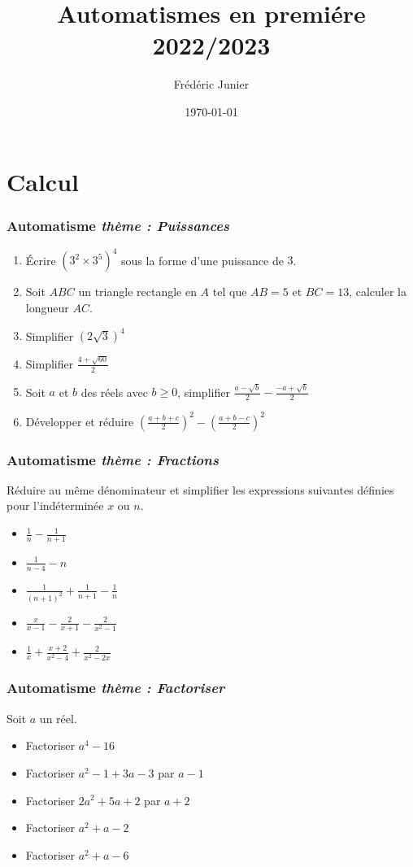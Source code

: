 \documentclass[11pt]{beamer}
\title[automatismes]{Automatismes en premi\'ere 2022/2023}
\author[F.Junier]{Fr\'ed\'eric Junier}
\institute[Le Parc]{{\centering Lyc\'ee du Parc \\
1 Boulevard Anatole France \\ 69006 Lyon }}
\date[\today]{\today}
\newcounter{autocompteur}
\newcommand{\automatisme}[1]{\addtocounter{autocompteur}{1}\frametitle{Automatisme  \theautocompteur  \textit{ thème : #1}}}
\begin{document}
\frame{\titlepage}

\section{Calcul}



\begin{frame}
\automatisme{Puissances}


\begin{enumerate}
	\item Écrire $(3^{2} \times 3^{5})^{4}$ sous la forme d'une puissance de $3$.
	\item Soit $ABC$ un triangle rectangle en $A$ tel que $AB=5$ et $BC=13$, calculer la longueur $AC$.
	\item Simplifier $\left(2\sqrt{3}\right)^{4}$
	\item Simplifier $\frac{4+\sqrt{60}}{2}$
	\item Soit $a$ et $b$ des réels avec $b\geqslant 0$, simplifier $\frac{a-\sqrt{b}}{2}-\frac{-a+\sqrt{b}}{2}$
        \item Développer et réduire $\left(\frac{a+b+c}{2}\right)^{2}-\left(\frac{a+b-c}{2}\right)^{2}$
  \end{enumerate}
\end{frame}

 
\begin{frame}
\automatisme{Fractions}

Réduire au même dénominateur et simplifier les expressions suivantes définies pour l'indéterminée $x$ ou $n$.

\begin{itemize}
\item $\frac{1}{n}-\frac{1}{n+1}$
\item $\frac{1}{n-4}-n$
\item $\frac{1}{(n+1)^{2}}+\frac{1}{n+1}-\frac{1}{n}$
\item $\frac{x}{x-1}-\frac{2}{x+1}-\frac{2}{x^2-1}$
\item $\frac{1}{x} + \frac{x+2}{x^{2}-4}+\frac{2}{x^{2}-2x}$
\end{itemize}

\end{frame}





\begin{frame}
\automatisme{Factoriser}

Soit $a$ un réel.

\begin{itemize}
\item Factoriser $a^{4}-16$
\item Factoriser $a^2-1+3a-3$ par $a-1$
\item Factoriser $2a^2+5a+2$ par $a+2$
\item Factoriser $a^{2}+a-2$
\item Factoriser $a^{2}+a-6$
\end{itemize}

\end{frame}
\end{document}
